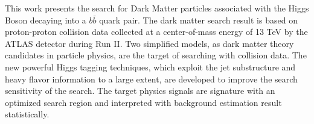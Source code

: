 This work presents the search for Dark Matter particles associated with the Higgs Boson decaying into a $b\bar{b}$ quark pair. 
The dark matter search result is based on proton-proton collision data collected at a center-of-mass energy of 13 TeV by the ATLAS detector during Run II. 
Two simplified models, as dark matter theory candidates in particle physics, are the target of searching with collision data. 
The new powerful Higgs tagging techniques, which exploit the jet substructure and heavy flavor information to a large extent, are developed to improve the search sensitivity of the search. 
The target physics signals are signature with an optimized search region and interpreted with background estimation result statistically.
